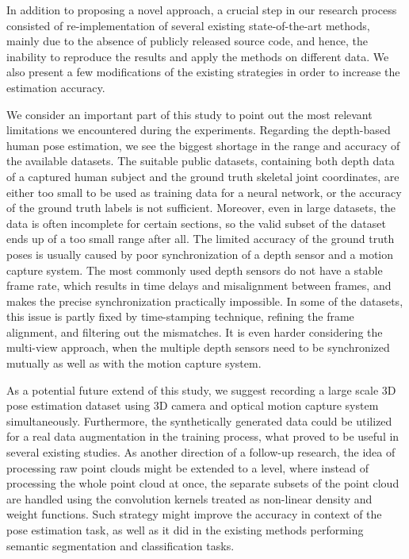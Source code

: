 \vspace{5mm}
\noindent
In addition to proposing a novel approach, a crucial step in our research process consisted of re-implementation of several existing state-of-the-art methods, mainly due to the absence of publicly released source code, and hence, the inability to reproduce the results and apply the methods on different data. We also present a few modifications of the existing strategies in order to increase the estimation accuracy.\par
\vspace{5mm}
\noindent
We consider an important part of this study to point out the most relevant limitations we encountered during the experiments. Regarding the depth-based human pose estimation, we see the biggest shortage in the range and accuracy of the available datasets. The suitable public datasets, containing both depth data of a captured human subject and the ground truth skeletal joint coordinates, are either too small to be used as training data for a neural network, or the accuracy of the ground truth labels is not sufficient. Moreover, even in large datasets, the data is often incomplete for certain sections, so the valid subset of the dataset ends up of a too small range after all. The limited accuracy of the ground truth poses is usually caused by poor synchronization of a depth sensor and a motion capture system. The most commonly used depth sensors do not have a stable frame rate, which results in time delays and misalignment between frames, and makes the precise synchronization practically impossible. In some of the datasets, this issue is partly fixed by time-stamping technique, refining the frame alignment, and filtering out the mismatches. It is even harder considering the multi-view approach, when the multiple depth sensors need to be synchronized mutually as well as with the motion capture system.\par
\vspace{5mm}
\noindent
As a potential future extend of this study, we suggest recording a large scale 3D pose estimation dataset using 3D camera and optical motion capture system simultaneously. Furthermore, the synthetically generated data could be utilized for a real data augmentation in the training process, what proved to be useful in several existing studies. As another direction of a follow-up research, the idea of processing raw point clouds might be extended to a level, where instead of processing the whole point cloud at once, the separate subsets of the point cloud are handled using the convolution kernels treated as non-linear density and weight functions. Such strategy might improve the accuracy in context of the pose estimation task, as well as it did in the existing methods performing semantic segmentation and classification tasks.\par